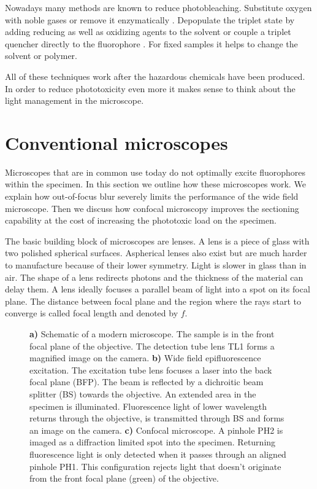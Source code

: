Nowadays many methods are known to reduce photobleaching. Substitute
oxygen with noble gases or remove it enzymatically
\citep[p.~89]{Sauer2011}. Depopulate the triplet state by adding
reducing as well as oxidizing agents to the solvent
\citep{Vogelsang2008} or couple a triplet quencher directly to the
fluorophore \citep[p.~19]{Sauer2011}. For fixed samples it helps to
change the solvent or polymer.

All of these techniques work after the hazardous chemicals have been
produced. In order to reduce phototoxicity even more it makes sense to
think about the light management in the microscope.
\section{Conventional microscopes}
\begin{summary}
  Microscopes that are in common use today do not optimally excite
  fluorophores within the specimen. In this section we outline how
  these microscopes work. We explain how out-of-focus blur severely
  limits the performance of the wide field microscope. Then we discuss
  how confocal microscopy improves the sectioning capability at the
  cost of increasing the phototoxic load on the specimen.
\end{summary}
The basic building block of microscopes are lenses. A lens is a piece
of glass with two polished spherical surfaces. Aspherical lenses also
exist but are much harder to manufacture because of their lower
symmetry. Light is slower in glass than in air. The shape of a lens
redirects photons and the thickness of the material can delay them. A
lens ideally focuses a parallel beam of light into a spot on its focal
plane. The distance between focal plane and the region where the rays
start to converge is called focal length and denoted by $f$.
\begin{figure}[!hbt]
  \centering
  
  \caption{{\bf a)} Schematic of a modern microscope. The sample is in
    the front focal plane of the objective. The detection tube lens TL1
    forms a magnified image on the camera. {\bf b)} Wide field
    epifluorescence excitation. The excitation tube lens focuses a
    laser into the back focal plane (BFP). The beam is reflected by a
    dichroitic beam splitter (BS) towards the objective. An extended
    area in the specimen is illuminated. Fluorescence light of lower
    wavelength returns through the objective, is transmitted through
    BS and forms an image on the camera. {\bf c)} Confocal
    microscope. A pinhole PH2 is imaged as a diffraction limited spot
    into the specimen. Returning fluorescence light is only detected
    when it passes through an aligned pinhole PH1. This configuration
    rejects light that doesn't originate from the front focal plane
    (green) of the objective.}
  \label{fig:widefield-microscope}
\end{figure}

